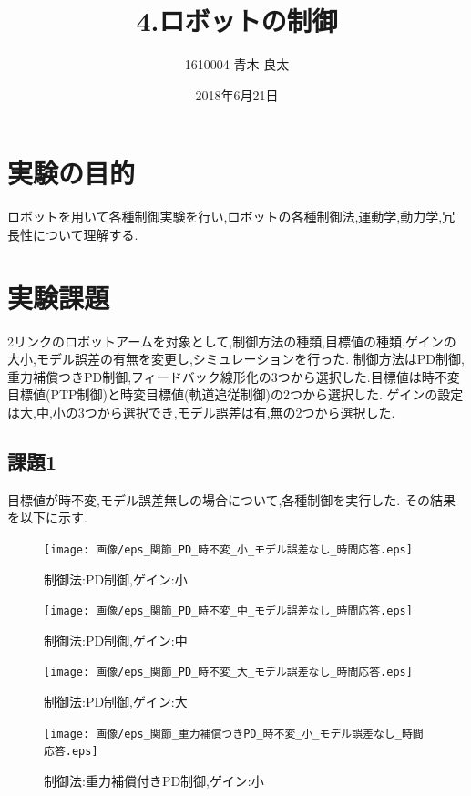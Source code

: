 \documentclass[a4paper,11pt,titlepage]{jsarticle}
\title{4.ロボットの制御}
\author{1610004 青木 良太}
\date{2018年6月21日} %
\begin{document}
\maketitle

\section{実験の目的}
ロボットを用いて各種制御実験を行い,ロボットの各種制御法,運動学,動力学,冗長性について理解する.
\section{実験課題}
2リンクのロボットアームを対象として,制御方法の種類,目標値の種類,ゲインの大小,モデル誤差の有無を変更し,シミュレーションを行った.
制御方法はPD制御,重力補償つきPD制御,フィードバック線形化の3つから選択した.目標値は時不変目標値(PTP制御)と時変目標値(軌道追従制御)の2つから選択した.
ゲインの設定は大,中,小の3つから選択でき,モデル誤差は有,無の2つから選択した.

\subsection{課題1}
目標値が時不変,モデル誤差無しの場合について,各種制御を実行した.
その結果を以下に示す.

\begin{figure}[H]
  \begin{center}
    \texttt{[image: 画像/eps\_関節\_PD\_時不変\_小\_モデル誤差なし\_時間応答.eps]}
    \caption{制御法:PD制御,ゲイン:小}
    \label{PD/ゲイン小}
  \end{center}
\end{figure}

\begin{figure}[H]
  \begin{center}
    \texttt{[image: 画像/eps\_関節\_PD\_時不変\_中\_モデル誤差なし\_時間応答.eps]}
    \caption{制御法:PD制御,ゲイン:中}
    \label{PD/ゲイン中}
  \end{center}

\end{figure}
\begin{figure}[H]
  \begin{center}
    \texttt{[image: 画像/eps\_関節\_PD\_時不変\_大\_モデル誤差なし\_時間応答.eps]}
    \caption{制御法:PD制御,ゲイン:大}
    \label{PD/ゲイン大}
  \end{center}
\end{figure}

\begin{figure}[H]
  \begin{center}
    \texttt{[image: 画像/eps\_関節\_重力補償つきPD\_時不変\_小\_モデル誤差なし\_時間応答.eps]}
    \caption{制御法:重力補償付きPD制御,ゲイン:小}
    \label{PDG/ゲイン小}
  \end{center}
\end{figure}
\end{document}
